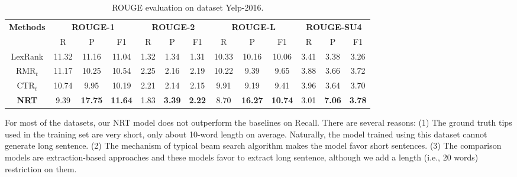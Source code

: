 \documentclass[sigconf]{acmart}
\begin{document}
\begin{table*}[!htb]
	\centering
	
	\caption{ROUGE evaluation on dataset Yelp-2016.}
	\label{tab:rouge-yelp}
	\begin{tabular}{|c|c|c|c|c|c|c|c|c|c|c|c|c|}
		\hline
		\multirow{2}{*}{\textbf{Methods}} &
		\multicolumn{3}{c|}{\textbf{ROUGE-1}} &
		\multicolumn{3}{c|}{\textbf{ROUGE-2}} &
		\multicolumn{3}{c|}{\textbf{ROUGE-L}} &
		\multicolumn{3}{c|}{\textbf{ROUGE-SU4}} \\
		\cline{2-13}
		& R & P & F1 & R & P & F1& R & P & F1& R & P & F1 \\
		\hline
		LexRank & 11.32 & 11.16 & 11.04
		& 1.32 & 1.34 & 1.31
		& 10.33 & 10.16 & 10.06
		& 3.41 & 3.38 & 3.26 \\
		\hline
		RMR$_t$ & 11.17 & 10.25 & 10.54
		& 2.25 & 2.16 & 2.19
		& 10.22 & 9.39 & 9.65
		& 3.88 & 3.66 & 3.72 \\
		\hline
		CTR$_t$ & 10.74 & 9.95 & 10.19
		& 2.21 & 2.14 & 2.15
		& 9.91 & 9.19 & 9.41
		& 3.96 & 3.64 & 3.70 \\
		\hline
		\textbf{NRT} & 9.39 & \textbf{17.75} & \textbf{11.64}
		& 1.83 & \textbf{3.39} & \textbf{2.22}
		& 8.70 & \textbf{16.27} & \textbf{10.74}
		& 3.01 & \textbf{7.06} & \textbf{3.78} \\
		\hline
	\end{tabular}
\end{table*}

For most of the datasets, our NRT model does not outperform
the baselines on Recall.
There are several reasons: (1) The ground truth tips used in the training set are very short, only about 10-word length on average.
Naturally, the model trained using this dataset cannot generate long sentence.
(2) The mechanism of typical beam search algorithm makes the model favor short sentences.
(3) The comparison models are extraction-based approaches and these models favor to extract long sentence,
although we add a length (i.e., 20 words) restriction on them.
\end{document}
